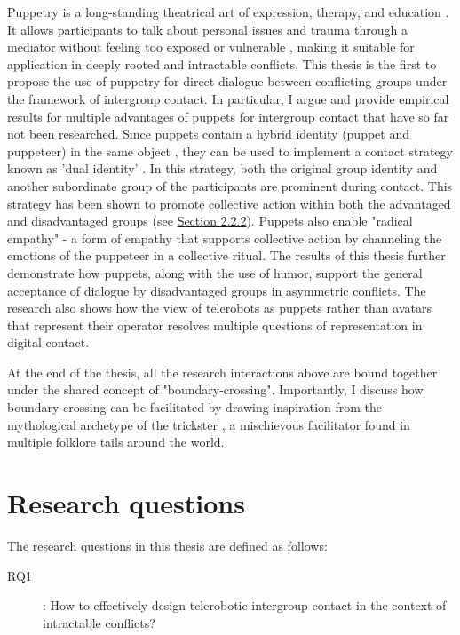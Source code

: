 \documentclass[dissertation,math,vertlayout,pdfa,colorlinks]{aaltoseries}
\begin{document}
Puppetry is a long-standing theatrical art of expression, therapy, and education \cite{krogerPuppetPedagogicalTool2019}. It allows participants to talk about personal issues and trauma through a mediator without feeling too exposed or vulnerable \cite{purcell-gatesAppliedPuppetryCommunities2020}, making it suitable for application in deeply rooted and intractable conflicts. This thesis is the first to propose the use of puppetry for direct dialogue between conflicting groups under the framework of intergroup contact. In particular, I argue and provide empirical results for multiple advantages of puppets for intergroup contact that have so far not been researched. Since puppets contain a hybrid identity (puppet and puppeteer) in the same object \cite{wisniewskaHybridityPuppetry2020}, they can be used to implement a contact strategy known as 'dual identity' \cite{gaertnerCategorizationRecategorizationIntergroup2005}. In this strategy,  both the original group identity and another subordinate group of the participants are prominent during contact. This strategy has been shown to promote collective action within both the advantaged and disadvantaged groups \cite{hasslerIntergroupContactSocial2021} (see \hyperref[sec:collective_action]{Section 2.2.2}). Puppets also enable "radical empathy" \cite{astlesWalkWalkMy2020} - a form of empathy that supports collective action by channeling the emotions of the puppeteer in a collective ritual. The results of this thesis further demonstrate how puppets, along with the use of humor, support the general acceptance of dialogue by disadvantaged groups in asymmetric conflicts. The research also shows how the view of telerobots as puppets rather than avatars that represent their operator resolves multiple questions of representation in digital contact.

At the end of the thesis, all the research interactions above are bound together under the shared concept of "boundary-crossing". Importantly, I discuss how boundary-crossing can be facilitated by drawing inspiration from the mythological archetype of the trickster \cite{hydeTricksterMakesThis1997}, a mischievous facilitator found in multiple folklore tails around the world.

\section{Research questions}
The research questions in this thesis are defined as follows:

\begin{description}
\item[RQ1]: How to effectively design telerobotic intergroup contact in the context of intractable conflicts?
\end{description}
\end{document}
